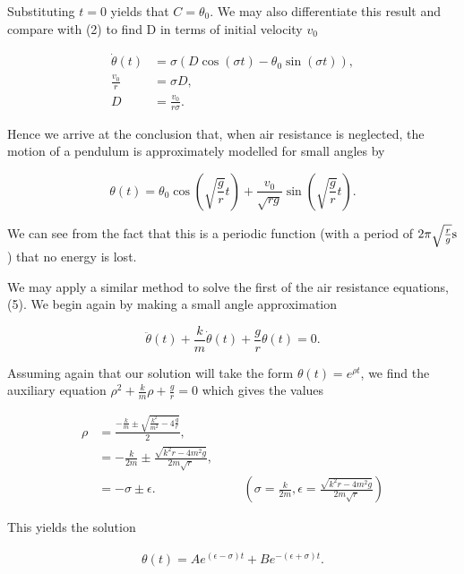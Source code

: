 \documentclass{article}
\begin{document}
Substituting $t = 0$ yields that $C = \theta_0$. We may also differentiate this result and compare with (2) to find D in terms of initial velocity $v_0$

\begin{align*}
	\dot{\theta}(t) &= \sigma \left(D\cos(\sigma t) - \theta_0\sin(\sigma t)\right), \\
	\frac{v_0}{r} &= \sigma D, \\
	D &= \frac{v_0}{r \sigma}.
\end{align*}

Hence we arrive at the conclusion that, when air resistance is neglected, the motion of a pendulum is approximately modelled for small angles by

\begin{equation}
	\theta(t) = \theta_0\cos\left(\sqrt{\frac{g}{r}} t\right) + \frac{v_0}{\sqrt{rg}}\sin\left(\sqrt{\frac{g}{r}} t\right).
\end{equation}

We can see from the fact that this is a periodic function (with a period of $2\pi\sqrt{\frac{r}{g}}\textnormal{s}$) that no energy is lost.

We may apply a similar method to solve the first of the air resistance equations, (5). We begin again by making a small angle approximation

\begin{equation}
	\ddot{\theta}(t) + \frac{k}{m}\dot{\theta}(t) + \frac{g}{r}\theta(t) = 0. \tag{5*}
\end{equation}

Assuming again that our solution will take the form $\theta(t) = e^{\rho t}$, we find the auxiliary equation $\rho^2 + \frac{k}{m}\rho + \frac{g}{r} = 0$ which gives the values

\begin{align*}
	\rho &= \frac{-\frac{k}{m} \pm \sqrt{\frac{k^2}{m^2} - 4 \frac{g}{r}}}{2}, \\
	&= -\frac{k}{2m} \pm \frac{\sqrt{k^2r-4m^2g}}{2m\sqrt{r}}, \\
	&= -\sigma \pm \epsilon. &&& \left(\sigma = \frac{k}{2m}, \epsilon = \frac{\sqrt{k^2r-4m^2g}}{2m\sqrt{r}} \right)
\end{align*}

This yields the solution

\begin{align*}
	\theta(t) = Ae^{(\epsilon - \sigma)t} + Be^{-(\epsilon + \sigma)t}.
\end{align*}
\end{document}
